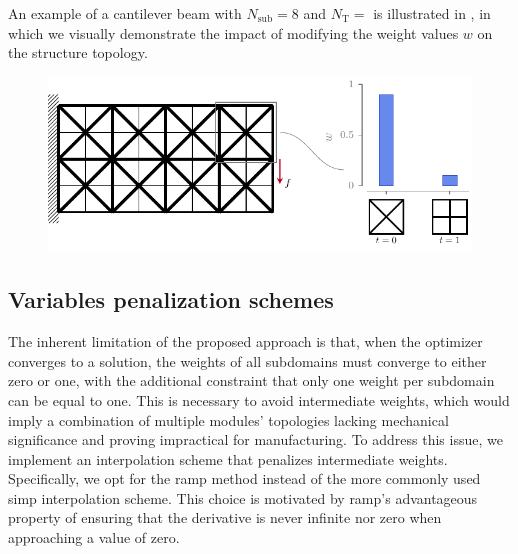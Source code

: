 An example of a cantilever beam with $N_\text{sub}=8$ and $N_\text{T}=$ is illustrated in , in which we visually demonstrate the impact of modifying the weight values $w$ on the structure topology.

\begin{figure}
    \centering
    \includegraphics{figures/06_DMO/00_weight_dmo/weight_dmo.pdf}
    \caption{}
    \label{fig:06_weighted_sum}
\end{figure}

\subsection{Variables penalization schemes}
The inherent limitation of the proposed approach is that, when the optimizer converges to a solution, the weights of all subdomains must converge to either zero or one, with the additional constraint that only one weight per subdomain can be equal to one. This is necessary to avoid intermediate weights, which would imply a combination of multiple modules' topologies lacking mechanical significance and proving impractical for manufacturing. To address this issue, we implement an interpolation scheme that penalizes intermediate weights. Specifically, we opt for the \gls{ramp} method  instead of the more commonly used \gls{simp} interpolation scheme. This choice is motivated by \gls{ramp}'s advantageous property of ensuring that the derivative is never infinite nor zero when approaching a value of zero.

